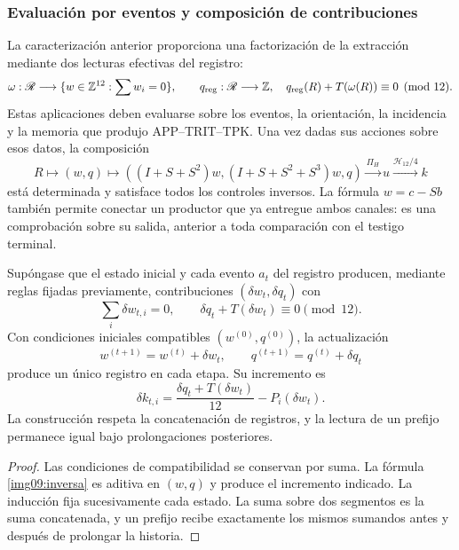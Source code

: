 \subsubsection{Evaluación por eventos y composición de contribuciones}

La caracterización anterior proporciona una factorización de la extracción mediante dos
lecturas efectivas del registro:
\begin{equation}
 \omega:\mathscr R\longrightarrow
 \{w\in\mathbb Z^{12}:\sum w_i=0\},\qquad
 q_{\rm reg}:\mathscr R\longrightarrow\mathbb Z,
 \quad q_{\rm reg}(R)+T(\omega(R))\equiv0\pmod {12}.
 \label{img09:contrato-productor}
\end{equation}
Estas aplicaciones deben evaluarse sobre los eventos, la orientación,
la incidencia y la memoria que produjo APP--TRIT--TPK. Una vez dadas sus
acciones sobre esos datos, la composición
\[
 R\longmapsto(w,q)\longmapsto
 ((I+S+S^2)w,(I+S+S^2+S^3)w,q)
 \xrightarrow{\Pi_H}u\xrightarrow{\mathcal H_{12}/4}k
\]
está determinada y satisface todos los controles inversos. La fórmula
$w=c-Sb$ también permite conectar un productor que ya entregue ambos
canales: es una comprobación sobre su salida, anterior a toda comparación
con el testigo terminal.

\begin{proposition}
\label{img09:acumulacion}
Supóngase que el estado inicial y cada evento $a_t$ del registro
producen, mediante reglas fijadas previamente, contribuciones
$(\delta w_t,\delta q_t)$ con
\[
 \sum_i\delta w_{t,i}=0,\qquad
 \delta q_t+T(\delta w_t)\equiv0\pmod {12}.
\]
Con condiciones iniciales compatibles $(w^{(0)},q^{(0)})$, la
actualización
\[
 w^{(t+1)}=w^{(t)}+\delta w_t,\qquad
 q^{(t+1)}=q^{(t)}+\delta q_t
\]
produce un único registro en cada etapa. Su incremento es
\[
 \delta k_{t,i}=
 \frac{\delta q_t+T(\delta w_t)}{12}-P_i(\delta w_t).
\]
La construcción respeta la concatenación de registros, y la lectura
de un prefijo permanece igual bajo prolongaciones posteriores.
\end{proposition}
\begin{proof}
Las condiciones de compatibilidad se conservan por suma. La fórmula
\eqref{img09:inversa} es aditiva en $(w,q)$ y produce el
incremento indicado. La inducción fija sucesivamente cada estado.
La suma sobre dos segmentos es la suma concatenada, y un prefijo recibe
exactamente los mismos sumandos antes y después de prolongar la historia.
\end{proof}

